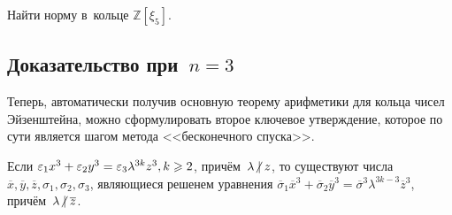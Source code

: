 \documentclass{article}
\begin{document}
\begin{exercise}[сложное]
  \label{ex_norm_5}
  Найти норму в~кольце $\mathbb{Z}[\xi_5]$.
\end{exercise}

\subsection{Доказательство при~$n = 3$}

Теперь, автоматически получив основную теорему арифметики для кольца чисел
Эйзенштейна, можно сформулировать второе ключевое утверждение, которое по сути
является шагом метода <<бесконечного спуска>>.

\begin{claim}
  \label{fermat_3}
  Если $\varepsilon_1 x^3 + \varepsilon_2 y^3 = \varepsilon_3 \lambda^{3k} z^3, k \geqslant 2$,
  причём~$\lambda \ndiv z$, то существуют числа~$\overline{x}, \overline{y},
  \overline{z}, \sigma_1, \sigma_2, \sigma_3$, являющиеся решенем уравнения
  $\overline \sigma_1 \overline{x}^3 +
   \overline \sigma_2 \overline{y}^3 =
   \overline \sigma^3 \lambda^{3k-3} \overline{z}^3$,
   причём~$\lambda \ndiv \overline{z}$.
\end{claim}
\end{document}
